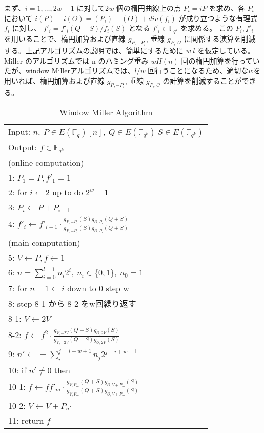 まず、$i=1,\ldots,2w-1$ に対して2$w$ 個の楕円曲線上の点 $P_i = iP$ を求め、各 $P_i$ において
$i(P) − i(O) = (P _i) − (O) + div(f _i)$ が成り立つような有理式 $f _i$ に対し、
$f' _i  = f' _i(Q + S) /f _i(S)$ となる $f' _i ∈ \mathbb{F}_{q^k}$ を求める。
この $P_i, f' _i$ を用いることで、楕円加算および直線 $g _{P, -P_i}$, 垂線 $g _{P_i , \mathcal{O}}$
に関係する演算を削減する。上記アルゴリズムの説明では、簡単にするために $w|l$ を仮定している。
 Miller のアルゴリズムでは n のハミング重み $wH (n)$ 回の楕円加算を行っていたが、window Millerアルゴリズムでは、$l/w$ 回行うことになるため、適切な$w$を用いれば、楕円加算および直線 $g _{P, -P_i}$, 垂線 $g _{P_i, \mathcal{O}}$ の計算を削減することができる。
\par

\begin{table}[htbp]
 \begin{center}
  \begin{tabular}{|l|}
     \hline
     Input: $n, \ P \in E(\mathbb{F}_q)[n], \ Q \in E(\mathbb{F}_{q^k}) \ S \in E(\mathbb{F}_{q^k})$ \\
     Output: $f \in \mathbb{F}_{q^k}$  \\
     \hline
     (online computation) \\
     1: \quad $P_1 = P, f'_1=1 $\\
     2: \quad for $i \gets 2$ up to do $2^w -1$\\
     3: \quad \quad $P_i \gets P + P_{i-1} $\\
     4: \quad \quad $f'_i \gets f'_{i-1} \cdot \frac{g_{P,-P_i}(S)g_{\mathcal{O},P_i}(Q+S)}{g_{P,-P_i}(S)g_{\mathcal{O},P_i}(Q+S)}$\\
     (main computation) \\
     5: \quad $V \gets P, f \gets 1 $\\
     6: \quad $n=\sum^{l - 1}_{i=0} n_i 2^i, \ n_i \in \{0,1\},\ n_0 = 1$\\
     7: \quad for $ n-1 \gets i$ down to 0 step w\\
     8: \quad step 8-1 から 8-2 をw回繰り返す\\
     8-1: \quad\quad $V \gets 2V $\\
     8-2: \quad \quad $f \gets f^2 \cdot \frac{g_{V,-2V}(Q+S)g_{\mathcal{O},2V}(S)}{g_{V,-2V}(Q+S)g_{\mathcal{O},2V}(S)}$\\

     9: \quad $n' \gets =\sum^{j=i-w+1}_{i} n_{j}2^{j-i+w-1} $\\
     10: \quad if $n' \neq 0$ then\\
     10-1: \quad \quad $f \gets ff'_m \cdot \frac{g_{V,P_m}(Q+S)g_{\mathcal{O},V+P_m}(S)}{g_{V,P_m}(Q+S)g_{\mathcal{O},V+P_m}(S)}$ \\
     10-2: \quad \quad $V \gets V + P_{n'} $\\
     11: \quad return $f$\\
     \hline
   \end{tabular}
 \end{center}
 \caption{Window Miller Algorithm}
\end{table}
